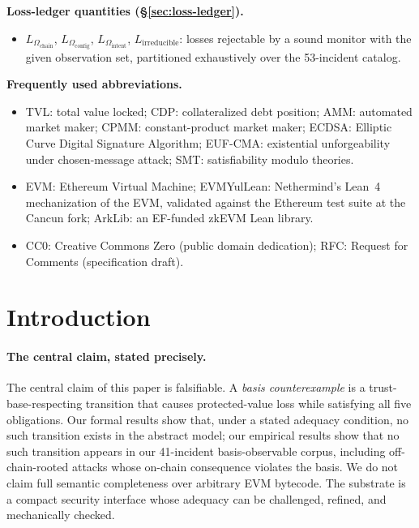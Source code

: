 \documentclass[11pt,a4paper]{article}
\begin{document}
\noindent\textbf{Loss-ledger quantities (\S\ref{sec:loss-ledger}).}
\begin{itemize}\itemsep0em
  \item $L_{\Omega_{\mathrm{chain}}}$, $L_{\Omega_{\mathrm{config}}}$, $L_{\Omega_{\mathrm{intent}}}$, $L_{\mathrm{irreducible}}$: losses rejectable by a sound monitor with the given observation set, partitioned exhaustively over the 53-incident catalog.
\end{itemize}

\noindent\textbf{Frequently used abbreviations.}
\begin{itemize}\itemsep0em
  \item TVL: total value locked; CDP: collateralized debt position; AMM: automated market maker; CPMM: constant-product market maker; ECDSA: Elliptic Curve Digital Signature Algorithm; EUF-CMA: existential unforgeability under chosen-message attack; SMT: satisfiability modulo theories.
  \item EVM: Ethereum Virtual Machine; EVMYulLean: Nethermind's Lean~4 mechanization of the EVM, validated against the Ethereum test suite at the Cancun fork; ArkLib: an EF-funded zkEVM Lean library.
  \item CC0: Creative Commons Zero (public domain dedication); RFC: Request for Comments (specification draft).
\end{itemize}

\section{Introduction}\label{sec:intro}

\paragraph{The central claim, stated precisely.} The central claim of this paper is falsifiable. A \emph{basis counterexample} is a trust-base-respecting transition that causes protected-value loss while satisfying all five obligations. Our formal results show that, under a stated adequacy condition, no such transition exists in the abstract model; our empirical results show that no such transition appears in our 41-incident basis-observable corpus, including off-chain-rooted attacks whose on-chain consequence violates the basis. We do not claim full semantic completeness over arbitrary EVM bytecode. The substrate is a compact security interface whose adequacy can be challenged, refined, and mechanically checked.
\end{document}
